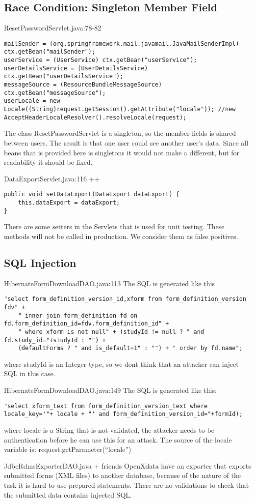 \documentclass[11pt,a4paper]{article}
\theoremstyle{definition}
\begin{document}
\subsection{Race Condition: Singleton Member Field}
ResetPasswordServlet.java:78-82
\begin{lstlisting}
mailSender = (org.springframework.mail.javamail.JavaMailSenderImpl) ctx.getBean("mailSender");
userService = (UserService) ctx.getBean("userService");
userDetailsService = (UserDetailsService) ctx.getBean("userDetailsService");
messageSource = (ResourceBundleMessageSource) ctx.getBean("messageSource");
userLocale = new Locale((String)request.getSession().getAttribute("locale")); //new AcceptHeaderLocaleResolver().resolveLocale(request);
\end{lstlisting}
The class ResetPasswordServlet is a singleton, so the member fields is shared between users.
The result is that one user could see another user's data.
Since all beans that is provided here is singletons it would not make a different, but for readability it should be fixed.


DataExportServlet.java:116 ++
\begin{lstlisting}
public void setDataExport(DataExport dataExport) {
    this.dataExport = dataExport;
}
\end{lstlisting}
There are some setters in the Servlets that is used for unit testing. These methods will not be called in production.
We consider them as false positives.

\subsection{SQL Injection}
HibernateFormDownloadDAO.java:113
The SQL is generated like this
\begin{lstlisting}
"select form_definition_version_id,xform from form_definition_version fdv" +
    " inner join form_definition fd on fd.form_definition_id=fdv.form_definition_id" +
    " where xform is not null" + (studyId != null ? " and fd.study_id="+studyId : "") +
    (defaultForms ? " and is_default=1" : "") + " order by fd.name";
\end{lstlisting}
where studyId is an Integer type, so we dont think that an attacker can inject SQL in this case.


HibernateFormDownloadDAO.java:149
The SQL is generated like this:
\begin{lstlisting}
"select xform_text from form_definition_version_text where locale_key='"+ locale + "' and form_definition_version_id="+formId);
\end{lstlisting}
where locale is a String that is not validated, the attacker needs to be authentication before he can use this for an attack.
The source of the locale variable is: request.getParameter(``locale'')


JdbcRdmsExporterDAO.java + friends
OpenXdata have an exporter that exports submitted forms (XML files) to another database, because of the nature of the task it is hard to use prepared statements.
There are no validations to check that the submitted data contains injected SQL.
\end{document}
